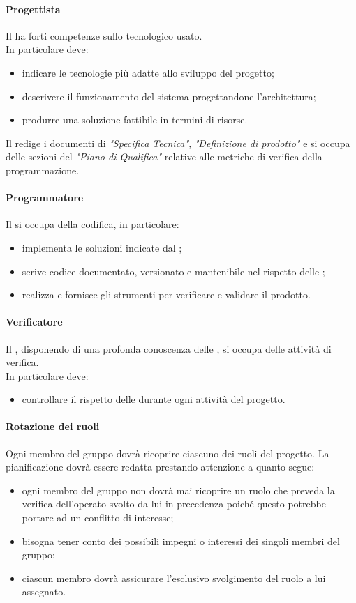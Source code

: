  \paragraph{Progettista}
 Il \PJ{} ha forti competenze sullo  tecnologico usato. \\
 In particolare deve: 
 \begin{itemize}
  \item indicare le tecnologie più adatte allo sviluppo del progetto;
  \item descrivere il funzionamento del sistema progettandone l'architettura;
  \item produrre una soluzione fattibile in termini di risorse.
 \end{itemize}
Il \PJ{} redige i documenti di \textit{"Specifica Tecnica"}, \textit{"Definizione di prodotto"} e si occupa delle sezioni del \textit{"Piano di Qualifica"} relative alle metriche di verifica della programmazione.

\paragraph{Programmatore}
 Il \PR{} si occupa della codifica, in particolare:
 \begin{itemize}
  \item implementa le soluzioni indicate dal \PJ ;
  \item scrive codice documentato, versionato e mantenibile nel rispetto delle \NPdoc ;
  \item realizza e fornisce gli strumenti per verificare e validare il prodotto.
 \end{itemize}
 \paragraph{Verificatore}
 Il \VER , disponendo di una profonda conoscenza delle \NPdoc , si occupa delle attività di verifica. \\
 In particolare deve: 
 \begin{itemize}
  \item controllare il rispetto delle \NPdoc durante ogni attività del progetto.
 \end{itemize}
 \paragraph{Rotazione dei ruoli}
 Ogni membro del gruppo dovrà ricoprire ciascuno dei ruoli del progetto. La pianificazione dovrà essere redatta prestando attenzione a quanto segue:
 \begin{itemize}
 	\item ogni membro del gruppo non dovrà mai ricoprire un ruolo che preveda la verifica dell'operato svolto da lui in precedenza poiché questo potrebbe portare ad un conflitto di interesse;
 	\item bisogna tener conto dei possibili impegni o interessi dei singoli membri del gruppo;
 	\item ciascun membro dovrà assicurare l'esclusivo svolgimento del ruolo a lui assegnato.
 \end{itemize}  
